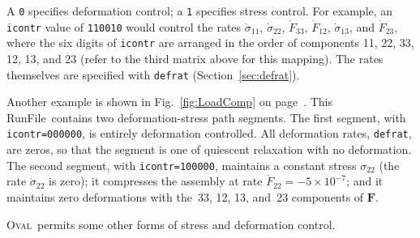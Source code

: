 \documentclass[letterpaper,11pt]{article}
\newcommand{\Oval}{\textsc{Oval}}
\newcommand{\RunFile}{\textsf{RunFile}}
\begin{document}
A \texttt{0} specifies deformation control;
a \texttt{1} specifies stress control.
For example, an \texttt{icontr} value of \texttt{110010} would 
control the rates $\dot{\sigma}_{11}$, $\dot{\sigma}_{22}$,
$\dot{F}_{33}$, $\dot{F}_{12}$,
$\dot{\sigma}_{13}$, and $\dot{F}_{23}$,
where the six digits of \texttt{icontr} are arranged in the
order of components \textrm{11}, \textrm{22}, \textrm{33}, \textrm{12},
\textrm{13}, and \textrm{23} (refer to the third matrix above
for this mapping).
The rates themselves are specified with \texttt{defrat} 
(Section~\ref{sec:defrat}).
\par
Another example is shown in Fig.~\ref{fig:LoadComp} 
on page~\pageref{fig:LoadComp}.
This \RunFile\ contains two deformation-stress path segments.
The first segment, with \texttt{icontr=000000}, is entirely
deformation controlled.  All deformation rates, \texttt{defrat}, are zeros,
so that the segment is one of quiescent relaxation with no deformation.
The second segment, with \texttt{icontr=100000}, maintains a constant
stress $\sigma_{22}$ (the rate $\dot{\sigma}_{22}$ is zero);
it compresses the assembly at rate $\dot{F}_{22}=-5\times 10^{-7}$;
and it maintains zero deformations with the~33, 12, 13, and~23
components of $\mathbf{F}$.
\par
\Oval\ permits some other forms of stress and deformation control.
\end{document}

